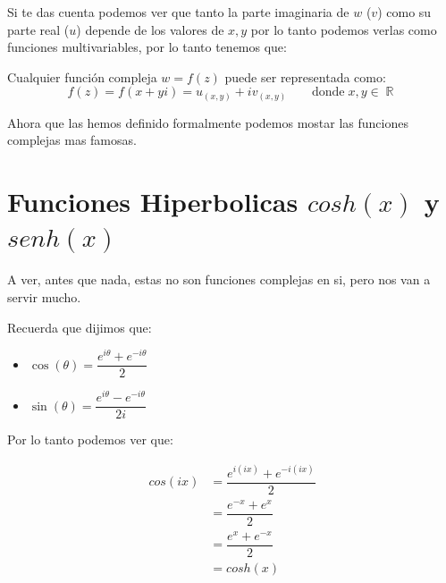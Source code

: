 \documentclass[12pt, fleqn]{report}                             %
\def \Eq {equation}                                             %
\newenvironment{MultiLineEquation}[1]                           %
        {\begin{\Eq}\begin{alignedat}{#1}}                          %
        {\end{alignedat}\end{\Eq}}                                  %
\DeclareMathOperator \Space     {\quad}                         %
\theoremstyle{break}                                            %
\DeclareMathOperator \Reals        {\mathbb{R}}                 %
\newcommand{\Wrap}[1]           {\left( #1 \right)}             %
\newcommand{\Cos}[1] {\cos\Wrap{#1}}                            %
\newcommand{\Sin}[1] {\sin\Wrap{#1}}                            %
\begin{document}
            Si te das cuenta podemos ver que tanto la parte imaginaria de $w$ ($v$) como su parte
            real ($u$) depende de los valores de $x, y$ por lo tanto podemos verlas como funciones
            multivariables, por lo tanto tenemos que:
                

            Cualquier función compleja $w = f(z)$ puede ser representada como:
            \begin{equation}
               f(z) = f(x+yi) = u_{(x, y)} + iv_{(x, y)} \Space\text{ donde}\; x, y \in \Reals 
            \end{equation}


            Ahora que las hemos definido formalmente podemos mostar las funciones complejas
            mas famosas.





        \clearpage
        \section{Funciones Hiperbolicas $cosh(x)$ y $senh(x)$}

            A ver, antes que nada, estas no son funciones complejas en si, pero nos
            van a servir mucho.

            Recuerda que dijimos que:

            \begin{itemize}
                \item $\Cos{\theta} = \dfrac{ e^{i\theta} + e^{-i\theta} }{2}$
                \item $\Sin{\theta} = \dfrac{ e^{i\theta} - e^{-i\theta} }{2i}$
            \end{itemize}

            Por lo tanto podemos ver que:

            \begin{MultiLineEquation}{2}
                cos(ix) &= \dfrac{ e^{i(ix)} + e^{-i(ix)} }{2}  \\
                        &= \dfrac{ e^{-x} + e^x }{2}            \\
                        &= \dfrac{ e^x + e^{-x} }{2}            \\
                        &= cosh(x) 
            \end{MultiLineEquation}
\end{document}
